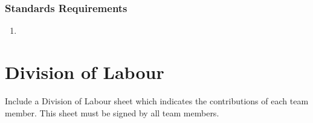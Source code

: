 \documentclass[]{article}
\begin{document}
\subsubsection{Standards Requirements}
\label{ssub:standards_requirements}
\begin{enumerate}[{LR-STD}1. ]
	\item 
\end{enumerate}



\appendix
\section{Division of Labour}
\label{sec:division_of_labour}
Include a Division of Labour sheet which indicates the contributions of each team member. This sheet must be signed by all team members.

\end{document}
